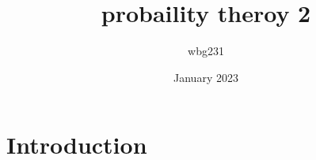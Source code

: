 \documentclass{article}
\title{probaility theroy 2}
\author{wbg231 }
\date{January 2023}
\begin{document}
\maketitle

\section{Introduction}
\end{document}
